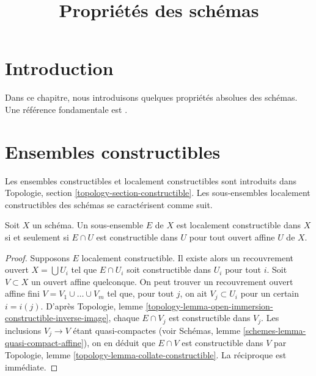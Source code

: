 

%


\title{Propriétés des schémas}

\maketitle

\label{section-phantom}

\tableofcontents

\section{Introduction}
\label{section-introduction}

\noindent
Dans ce chapitre, nous introduisons quelques propriétés absolues des schémas.
Une référence fondamentale est \cite{EGA}.

\section{Ensembles constructibles}
\label{section-constructible}

\noindent
Les ensembles constructibles et localement constructibles sont introduits dans
Topologie, section \ref{topology-section-constructible}.
Les sous-ensembles localement constructibles des schémas se caractérisent comme suit.

\begin{lemma}
\label{lemma-locally-constructible}
Soit $X$ un schéma.
Un sous-ensemble $E$ de $X$ est localement constructible dans $X$ si et seulement si
$E \cap U$ est constructible dans $U$ pour tout ouvert affine $U$ de $X$.
\end{lemma}

\begin{proof}
Supposons $E$ localement constructible. Il existe alors un recouvrement ouvert
$X = \bigcup U_i$ tel que $E \cap U_i$ soit constructible dans $U_i$
pour tout $i$. Soit $V \subset X$ un ouvert affine quelconque. On peut trouver un
recouvrement ouvert affine fini $V = V_1 \cup \ldots \cup V_m$ tel que, pour tout $j$,
on ait $V_j \subset U_i$ pour un certain $i = i(j)$. D'après
Topologie, lemme \ref{topology-lemma-open-immersion-constructible-inverse-image},
chaque $E \cap V_j$ est constructible dans $V_j$. Les inclusions
$V_j \to V$ étant quasi-compactes (voir
Schémas, lemme \ref{schemes-lemma-quasi-compact-affine}),
on en déduit que $E \cap V$ est constructible dans $V$ par
Topologie, lemme \ref{topology-lemma-collate-constructible}.
La réciproque est immédiate.
\end{proof}

